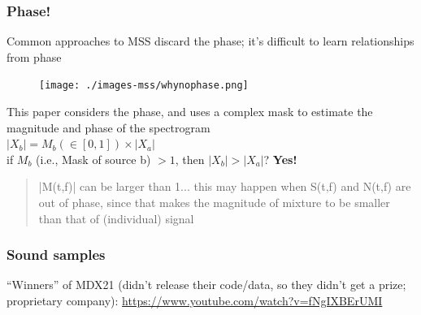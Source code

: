 \documentclass[usenames,dvipsnames]{beamer}
\begin{document}
\begin{frame}
	\frametitle{Phase!}
	Common approaches to MSS discard the phase; it's difficult to learn relationships from phase
	\begin{figure}
	\centering
	\texttt{[image: ./images-mss/whynophase.png]}
	\end{figure}
	This paper considers the phase, and uses a complex mask to estimate the magnitude and phase of the spectrogram\\
	$|X_{b}| = M_{b}(\in [0, 1]) \times |X_{a}|$\\
	if $M_{b}$ (i.e., Mask of source b) $> 1$, then $|X_{b}| > |X_{a}|$?
	\textbf{Yes!} 
	\begin{quote}
		|M(t,f)| can be larger than 1... this may happen when S(t,f) and N(t,f) are out of phase, since that makes the magnitude of mixture to be smaller than that of (individual) signal
	\end{quote}
\end{frame}

\begin{frame}
	\frametitle{Sound samples}
	``Winners'' of MDX21 (didn't release their code/data, so they didn't get a prize; proprietary company):
	\url{https://www.youtube.com/watch?v=fNgIXBErUMI}
\end{frame}
\end{document}
